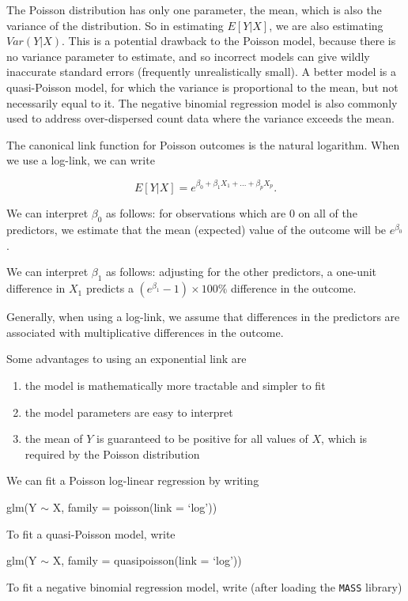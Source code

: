 \documentclass[
  letterpaper,
  DIV=11,
  numbers=noendperiod]{scrreprt}
\begin{document}
The Poisson distribution has only one parameter, the mean, which is also
the variance of the distribution. So in estimating \(E[Y|X]\), we are
also estimating \(Var(Y|X)\). This is a potential drawback to the
Poisson model, because there is no variance parameter to estimate, and
so incorrect models can give wildly inaccurate standard errors
(frequently unrealistically small). A better model is a quasi-Poisson
model, for which the variance is proportional to the mean, but not
necessarily equal to it. The negative binomial regression model is also
commonly used to address over-dispersed count data where the variance
exceeds the mean.

The canonical link function for Poisson outcomes is the natural
logarithm. When we use a log-link, we can write

\[E[Y|X] = e^{\beta_0 + \beta_1X_1 + ... + \beta_pX_p}.\]

We can interpret \(\beta_0\) as follows: for observations which are 0 on
all of the predictors, we estimate that the mean (expected) value of the
outcome will be \(e^{\beta_0}\).

We can interpret \(\beta_1\) as follows: adjusting for the other
predictors, a one-unit difference in \(X_1\) predicts a
\((e^{\beta_1}-1)\times100 \%\) difference in the outcome.

Generally, when using a log-link, we assume that differences in the
predictors are associated with multiplicative differences in the
outcome.

Some advantages to using an exponential link are

\begin{enumerate}
\def\labelenumi{\arabic{enumi}.}
\item
  the model is mathematically more tractable and simpler to fit
\item
  the model parameters are easy to interpret
\item
  the mean of \(Y\) is guaranteed to be positive for all values of
  \(X\), which is required by the Poisson distribution
\end{enumerate}

We can fit a Poisson log-linear regression by writing

glm(Y \(\sim\) X, family = poisson(link = `log'))

To fit a quasi-Poisson model, write

glm(Y \(\sim\) X, family = quasipoisson(link = `log'))

To fit a negative binomial regression model, write (after loading the
\texttt{MASS} library)
\end{document}
